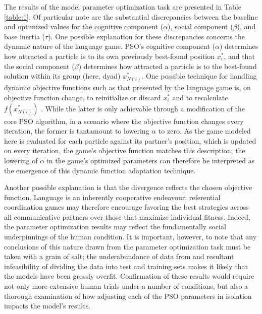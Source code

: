 \documentclass[a4paper,11pt]{article}
\begin{document}
The results of the model parameter optimization task are presented in Table \ref{table:1}. Of particular note are the substantial discrepancies between the baseline and optimized values for the cognitive component ($\alpha$), social component ($\beta$), and base inertia ($\tau$). One possible explanation for these discrepancies concerns the dynamic nature of the language game. PSO's cognitive component ($\alpha$) determines how attracted a particle is to its own previously best-found position $x_i^*$, and that the social component ($\beta$) determines how attracted a particle is to the best-found solution within its group (here, dyad) $x_{N(i)}^*$. One possible technique for handling dynamic objective functions such as that presented by the \citeauthor{rohde2012} language game is, on objective function change, to reinitialize or discard $x_i^*$ and to recalculate $f(x_{N(i)}^*)$ \cite{engelbrecht2005}. While the latter is only achievable through a modification of the core PSO algorithm, in a scenario where the objective function changes every iteration, the former is tantamount to lowering $\alpha$ to zero. As the game modeled here is evaluated for each particle against its partner's position, which is updated on every iteration, the game's objective function matches this description; the lowering of $\alpha$ in the game's optimized parameters can therefore be interpreted as the emergence of this dynamic function adaptation technique.

Another possible explanation is that the divergence reflects the chosen objective function. Language is an inherently cooperative endeavour; referential coordination games may therefore encourage favoring the best strategies across all communicative partners over those that maximize individual fitness. Indeed, the parameter optimization results may reflect the fundamentally social underpinnings of the human condition. It is important, however, to note that any conclusions of this nature drawn from the parameter optimization task must be taken with a grain of salt; the underabundance of data from \citeauthor{rohde2012} and resultant infeasibility of dividing the data into test and training sets makes it likely that the models have been grossly overfit. Confirmation of these results would require not only more extensive human trials under a number of conditions, but also a thorough examination of how adjusting each of the PSO parameters in isolation impacts the model's results.
\end{document}

